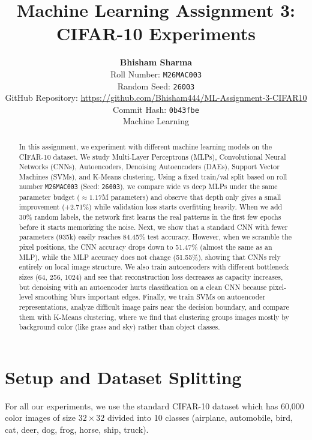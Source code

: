 \documentclass[10pt,twocolumn,letterpaper]{article}
\title{\textbf{Machine Learning Assignment 3: CIFAR-10 Experiments}}
\author{
    \textbf{Bhisham Sharma} \\
    Roll Number: \texttt{M26MAC003} \\
    Random Seed: \texttt{26003} \\
    GitHub Repository: \url{https://github.com/Bhisham444/ML-Assignment-3-CIFAR10} \\
    Commit Hash: \texttt{0b43fbe} \\
    Machine Learning
}
\date{}
\begin{document}
\maketitle

\begin{abstract}
In this assignment, we experiment with different machine learning models on the CIFAR-10 dataset. We study Multi-Layer Perceptrons (MLPs), Convolutional Neural Networks (CNNs), Autoencoders, Denoising Autoencoders (DAEs), Support Vector Machines (SVMs), and K-Means clustering. Using a fixed train/val split based on roll number \texttt{M26MAC003} (Seed: \texttt{26003}), we compare wide vs deep MLPs under the same parameter budget ($\approx 1.17$M parameters) and observe that depth only gives a small improvement (+2.71\%) while validation loss starts overfitting heavily. When we add 30\% random labels, the network first learns the real patterns in the first few epochs before it starts memorizing the noise. Next, we show that a standard CNN with fewer parameters (935k) easily reaches 84.45\% test accuracy. However, when we scramble the pixel positions, the CNN accuracy drops down to 51.47\% (almost the same as an MLP), while the MLP accuracy does not change (51.55\%), showing that CNNs rely entirely on local image structure. We also train autoencoders with different bottleneck sizes (64, 256, 1024) and see that reconstruction loss decreases as capacity increases, but denoising with an autoencoder hurts classification on a clean CNN because pixel-level smoothing blurs important edges. Finally, we train SVMs on autoencoder representations, analyze difficult image pairs near the decision boundary, and compare them with K-Means clustering, where we find that clustering groups images mostly by background color (like grass and sky) rather than object classes.
\end{abstract}

\section{Setup and Dataset Splitting}

For all our experiments, we use the standard CIFAR-10 dataset which has 60,000 color images of size $32 \times 32$ divided into 10 classes (airplane, automobile, bird, cat, deer, dog, frog, horse, ship, truck).
\end{document}
